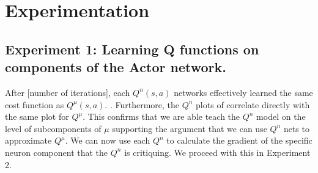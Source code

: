 \section{Experimentation}
\subsection{Experiment 1: Learning Q functions on components of the Actor network.}


After [number of iterations], each $Q^n(s,a)$  networks effectively learned the same cost function as $Q^{\mu}(s,a)$.
. Furthermore, the $Q^n$ plots of  correlate directly with the same plot for $Q^{\mu}$. This confirms that we are able teach the $Q^n$ model on the level of subcomponents of $\mu$ supporting the argument that we can use $Q^n$ nets to approximate $Q^\mu$. We can now use each $Q^n$ to calculate the gradient of the specific neuron component that the $Q^n$ is critiquing. We proceed with this in Experiment 2.
